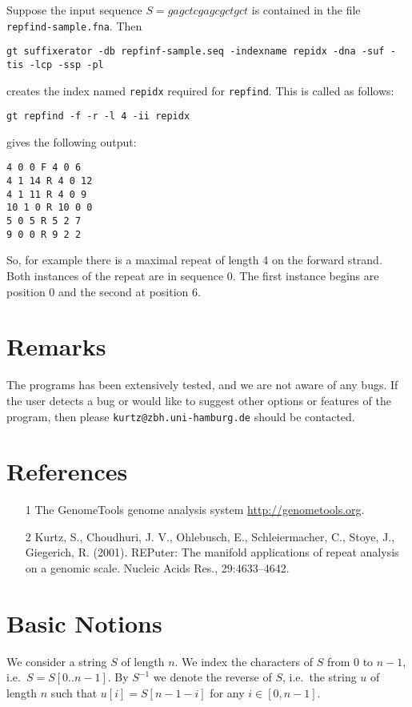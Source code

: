 \documentclass[12pt]{article}
\newcommand{\Repfind}[0]{\texttt{\small repfind}\xspace}
\newcommand{\Substring}[3]{#1[#2..#3]}
\newcommand{\Subchar}[2]{#1[#2]}
\begin{document}
Suppose the input sequence \(S=gagctcgagcgctgct\) 
is contained in the file \texttt{repfind-sample.fna}. Then 
\begin{footnotesize}
\begin{verbatim}
gt suffixerator -db repfinf-sample.seq -indexname repidx -dna -suf -tis -lcp -ssp -pl
\end{verbatim}
\end{footnotesize}
creates the index named \texttt{repidx} required for \Repfind. This is 
called as follows:

\begin{verbatim}
gt repfind -f -r -l 4 -ii repidx
\end{verbatim}
gives the following output:
\begin{verbatim}
4 0 0 F 4 0 6
4 1 14 R 4 0 12
4 1 11 R 4 0 9
10 1 0 R 10 0 0
5 0 5 R 5 2 7
9 0 0 R 9 2 2
\end{verbatim}
So, for example there is a maximal repeat of length 4  on the forward strand.
Both instances of the repeat are in sequence 0. The first instance begins
are position 0 and the second at position 6.

\section{Remarks}
The programs has been extensively tested, and we are not aware of any bugs.
If the user detects a bug or would like to suggest other options or 
features of the program, then please \texttt{kurtz@zbh.uni-hamburg.de}
should be contacted.

\section*{References}
\begin{enumerate}
\item[1]
The GenomeTools genome analysis system \url{http://genometools.org}.
\item[2]
Kurtz, S., Choudhuri, J. V., Ohlebusch, E., Schleiermacher, C., Stoye, J.,
Giegerich, R. (2001). REPuter: The manifold applications of repeat analysis on
a genomic scale. Nucleic Acids Res., 29:4633–4642.
\end{enumerate}

\appendix
\section{Basic Notions}\label{Basic}
We consider a string \(S\) of length \(n\). We index the characters of
\(S\) from \(0\) to \(n-1\), i.e.\ \(S=\Substring{S}{0}{n-1}\). By 
\(S^{-1}\) we denote the reverse of \(S\), i.e.\ the string \(u\) of length 
\(n\) such that \(\Subchar{u}{i}=\Subchar{S}{n-1-i}\) for 
any \(i\in[0,n-1]\).
\end{document}
